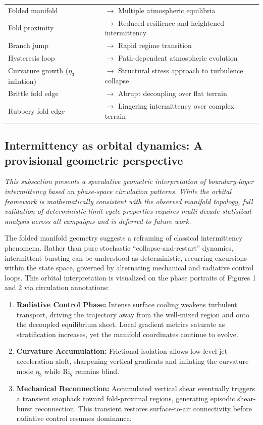 \documentclass[12pt,a4paper]{article}
\newcommand{\Rig}{\mathrm{Ri}_g}
\begin{document}
\begin{tabular}{@{}ll@{}}
Folded manifold & $\to$ Multiple atmospheric equilibria \\
Fold proximity & $\to$ Reduced resilience and heightened intermittency \\
Branch jump & $\to$ Rapid regime transition \\
Hysteresis loop & $\to$ Path-dependent atmospheric evolution \\
Curvature growth ($\eta_3$ inflation) & $\to$ Structural stress approach to turbulence collapse \\
Brittle fold edge & $\to$ Abrupt decoupling over flat terrain \\
Rubbery fold edge & $\to$ Lingering intermittency over complex terrain \\
\end{tabular}

\subsection{Intermittency as orbital dynamics: A provisional geometric perspective}

\textit{This subsection presents a speculative geometric interpretation of boundary-layer intermittency based on phase-space circulation patterns. While the orbital framework is mathematically consistent with the observed manifold topology, full validation of deterministic limit-cycle properties requires multi-decade statistical analysis across all campaigns and is deferred to future work.}

The folded manifold geometry suggests a reframing of classical intermittency phenomena. Rather than pure stochastic ``collapse-and-restart'' dynamics, intermittent bursting can be understood as deterministic, recurring excursions within the state space, governed by alternating mechanical and radiative control loops. This orbital interpretation is visualized on the phase portraits of Figures 1 and 2 via circulation annotations:

\begin{enumerate}
  \item \textbf{Radiative Control Phase:} Intense surface cooling weakens turbulent transport, driving the trajectory away from the well-mixed region and onto the decoupled equilibrium sheet. Local gradient metrics saturate as stratification increases, yet the manifold coordinates continue to evolve.
  \item \textbf{Curvature Accumulation:} Frictional isolation allows low-level jet acceleration aloft, sharpening vertical gradients and inflating the curvature mode $\eta_3$ while $\Rig$ remains blind.
  \item \textbf{Mechanical Reconnection:} Accumulated vertical shear eventually triggers a transient snapback toward fold-proximal regions, generating episodic shear-burst reconnection. This transient restores surface-to-air connectivity before radiative control resumes dominance.
\end{enumerate}
\end{document}

